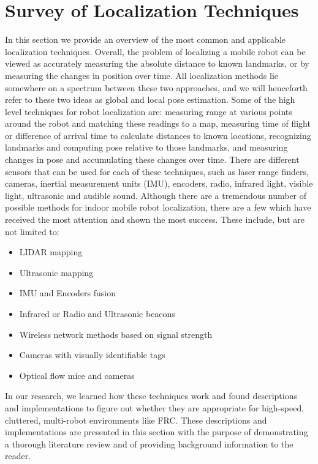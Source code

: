 \documentclass{article}
\begin{document}
\tableofcontents




\section{Survey of Localization Techniques} \label{section:related_work}

   In this section we provide an overview of the most common and applicable localization techniques. Overall, the problem of localizing a mobile robot can be viewed as accurately measuring the absolute distance to known landmarks, or by measuring the changes in position over time. All localization methods lie somewhere on a spectrum between these two approaches, and we will henceforth refer to these two ideas as global and local pose estimation. Some of the high level techniques for robot localization are: measuring range at various points around the robot and matching these readings to a map, measuring time of flight or difference of arrival time to calculate distances to known locations, recognizing landmarks and computing pose relative to those landmarks, and measuring changes in pose and accumulating these changes over time. There are different sensors that can be used for each of these techniques, such as laser range finders, cameras, inertial measurement units (IMU), encoders, radio, infrared light, visible light, ultrasonic and audible sound. Although there are a tremendous number of possible methods for indoor mobile robot localization, there are a few which have received the most attention and shown the most success. These include, but are not limited to:
  \begin{itemize}
    \item LIDAR mapping
    \item Ultrasonic mapping
    \item IMU and Encoders fusion
    \item Infrared or Radio and Ultrasonic beacons
    \item Wireless network methods based on signal strength
    \item Cameras with visually identifiable tags
    \item Optical flow mice and cameras
  \end{itemize}

  In our research, we learned how these techniques work and found descriptions and implementations to figure out whether they are appropriate for high-speed, cluttered, multi-robot environments like FRC. These descriptions and implementations are presented in this section with the purpose of demonstrating a thorough literature review and of providing background information to the reader.
\end{document}
